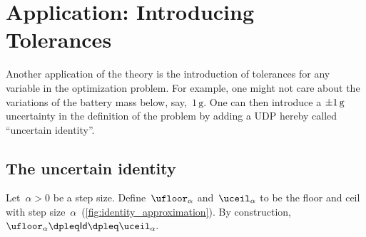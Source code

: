 \section{Application: Introducing Tolerances\label{sec:Application-tolerance}}

Another application of the theory is the introduction of tolerances
for any variable in the optimization problem. For example, one might
not care about the variations of the battery mass below, say,~$1\,\text{g}$.
One can then introduce a $\pm1\,\text{\ensuremath{\text{g}} }$ uncertainty
in the definition of the problem by adding a UDP hereby called ``uncertain
identity''.

\subsection{The uncertain identity}

Let~$\alpha>0$ be a step size. Define~$\ufloor_{\alpha}$ and~$\uceil_{\alpha}$
to be the floor and ceil with step size~$\alpha$~(\cref{fig:identity_approximation}).
By construction, $\ufloor_{\alpha}\dpleq\mathsf{Id}\dpleq\uceil_{\alpha}.$

